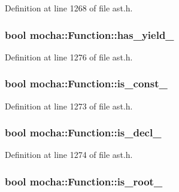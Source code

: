 Definition at line 1268 of file ast.h.

\hypertarget{classmocha_1_1_function_a854ca0fbe7fcf694b0fc9b9edbf1fd55}{
\subsubsection[{has\_\-yield\_\-}]{\setlength{\rightskip}{0pt plus 5cm}bool {\bf mocha::Function::has\_\-yield\_\-}}}
\label{classmocha_1_1_function_a854ca0fbe7fcf694b0fc9b9edbf1fd55}


Definition at line 1276 of file ast.h.

\hypertarget{classmocha_1_1_function_af16f2b3ef9c2e2aeedd8bd2f498b3e68}{
\subsubsection[{is\_\-const\_\-}]{\setlength{\rightskip}{0pt plus 5cm}bool {\bf mocha::Function::is\_\-const\_\-}}}
\label{classmocha_1_1_function_af16f2b3ef9c2e2aeedd8bd2f498b3e68}


Definition at line 1273 of file ast.h.

\hypertarget{classmocha_1_1_function_a921285276ef8d34a0be645fa2f30ff22}{
\subsubsection[{is\_\-decl\_\-}]{\setlength{\rightskip}{0pt plus 5cm}bool {\bf mocha::Function::is\_\-decl\_\-}}}
\label{classmocha_1_1_function_a921285276ef8d34a0be645fa2f30ff22}


Definition at line 1274 of file ast.h.

\hypertarget{classmocha_1_1_function_a9e6f90ffd90e9300d52fa848fa683bd7}{
\subsubsection[{is\_\-root\_\-}]{\setlength{\rightskip}{0pt plus 5cm}bool {\bf mocha::Function::is\_\-root\_\-}}}
\label{classmocha_1_1_function_a9e6f90ffd90e9300d52fa848fa683bd7}


